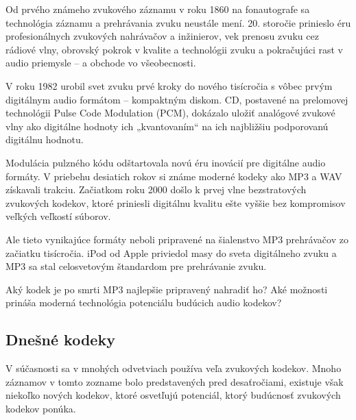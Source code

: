 \documentclass[10pt,twoside,slovak,a4paper]{article}
\begin{document}
Od prvého známeho zvukového záznamu v roku 1860 na fonautografe sa technológia záznamu a prehrávania zvuku neustále mení. 20. storočie prinieslo éru profesionálnych zvukových nahrávačov a inžinierov, vek prenosu zvuku cez rádiové vlny, obrovský pokrok v kvalite a technológii zvuku a pokračujúci rast v audio priemysle – a obchode vo všeobecnosti.

V roku 1982 urobil svet zvuku prvé kroky do nového tisícročia s vôbec prvým digitálnym audio formátom – kompaktným diskom. CD, postavené na prelomovej technológii Pulse Code Modulation (PCM), dokázalo uložiť analógové zvukové vlny ako digitálne hodnoty ich „kvantovaním“ na ich najbližšiu podporovanú digitálnu hodnotu.

Modulácia pulzného kódu odštartovala novú éru inovácií pre digitálne audio formáty. V priebehu desiatich rokov si známe moderné kodeky ako MP3 a WAV získavali trakciu. Začiatkom roku 2000 došlo k prvej vlne bezstratových zvukových kodekov, ktoré priniesli digitálnu kvalitu ešte vyššie bez kompromisov veľkých veľkostí súborov.

Ale tieto vynikajúce formáty neboli pripravené na šialenstvo MP3 prehrávačov zo začiatku tisícročia. iPod od Apple priviedol masy do sveta digitálneho zvuku a MP3 sa stal celosvetovým štandardom pre prehrávanie zvuku.

Aký kodek je po smrti MP3 najlepšie pripravený nahradiť ho? Aké možnosti prináša moderná technológia potenciálu budúcich audio kodekov?  

\subsection{Dnešné kodeky} \label{dnes}

V súčasnosti sa v mnohých odvetviach používa veľa zvukových kodekov. Mnoho záznamov v tomto zozname bolo predstavených pred desaťročiami, existuje však niekoľko nových kodekov, ktoré osvetľujú potenciál, ktorý budúcnosť zvukových kodekov ponúka. 
\end{document}

